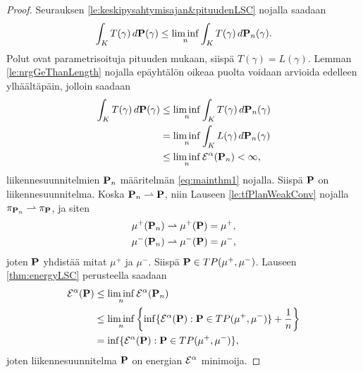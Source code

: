 \documentclass[12pt,oneside,a4paper]{amsbook} %
\begin{document}
\begin{proof}
    Seurauksen \ref{le:keskipysahtymisajan&pituudenLSC} nojalla saadaan
    \begin{equation*}
       \int_K T(\gamma)\, d\P(\gamma)  \le \liminf_n \int_K T(\gamma) \, d\P_n(\gamma).
    \end{equation*}
    Polut ovat parametrisoituja pituuden mukaan, siispä {$T(\gamma) = L(\gamma)$}. Lemman \ref{le:nrgGeThanLength} nojalla epäyhtälön oikeaa puolta voidaan arvioida edelleen ylhäältäpäin, jolloin saadaan
    \begin{align*}
        \int_K T(\gamma) \, d\P(\gamma) &\le \liminf_n \int_K T(\gamma) \, d\P_n(\gamma) \\
        & = \liminf_n \int_K L(\gamma) \, d\P_n(\gamma) \\
        & \le \liminf_n \E^\alpha(\P_n) < \infty,
    \end{align*}
    liikennesuunnitelmien $\P_n$ määritelmän \eqref{eq:mainthm1} nojalla. Siispä $\P$ on liikennesuunnitelma. Koska $\P_n \rightharpoonup \P$, niin Lauseen \ref{le:tfPlanWeakConv} nojalla $\pi_{\P_n} \rightharpoonup \pi_{\P}$, ja siten
    \begin{align*}
        \mu^+(\P_n) &\rightharpoonup \mu^+(\P) = \mu^+, \\ \mu^-(\P_n) &\rightharpoonup \mu^-(\P) = \mu^-,
    \end{align*} 
    joten $\P$ yhdistää mitat $\mu^+$ ja $\mu^-$. Siispä $\P \in TP(\mu^+, \mu^-)$. Lauseen \ref{thm:energyLSC} perusteella saadaan
    \begin{align*}
        \E^\alpha(\P) &\le \liminf_n \E^\alpha (\P_n) \\
        &\le \liminf_n \left\{\inf\{\E^\alpha(\P): \P\in TP(\mu^+, \mu^-)\} + \frac{1}{n}\right\} \\
        &= \inf\{\E^\alpha(\P): \P\in TP(\mu^+, \mu^-)\},
    \end{align*}
    joten liikennesuunnitelma $\P$ on energian $\E^\alpha$ minimoija.
\end{proof}



\end{document}

